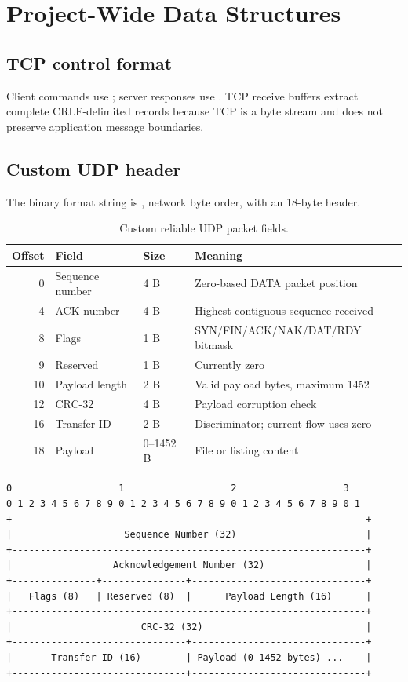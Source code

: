 \section{Project-Wide Data Structures}
\subsection{TCP control format}

Client commands use ;
server responses use .
TCP receive buffers extract complete CRLF-delimited records because TCP is a
byte stream and does not preserve application message boundaries.

\subsection{Custom UDP header}

The binary format string is , network byte order, with an
18-byte header.

\begin{table}[H]
\centering
\begin{tabular}{rllp{}}
\toprule
Offset & Field & Size & Meaning\\
\midrule
0 & Sequence number & 4 B & Zero-based DATA packet position\\
4 & ACK number & 4 B & Highest contiguous sequence received\\
8 & Flags & 1 B & SYN/FIN/ACK/NAK/DAT/RDY bitmask\\
9 & Reserved & 1 B & Currently zero\\
10 & Payload length & 2 B & Valid payload bytes, maximum 1452\\
12 & CRC-32 & 4 B & Payload corruption check\\
16 & Transfer ID & 2 B & Discriminator; current flow uses zero\\
18 & Payload & 0--1452 B & File or listing content\\
\bottomrule
\end{tabular}
\caption{Custom reliable UDP packet fields.}
\end{table}

\begin{lstlisting}
0                   1                   2                   3
0 1 2 3 4 5 6 7 8 9 0 1 2 3 4 5 6 7 8 9 0 1 2 3 4 5 6 7 8 9 0 1
+---------------------------------------------------------------+
|                    Sequence Number (32)                       |
+---------------------------------------------------------------+
|                  Acknowledgement Number (32)                  |
+---------------+---------------+-------------------------------+
|   Flags (8)   | Reserved (8)  |      Payload Length (16)      |
+---------------------------------------------------------------+
|                       CRC-32 (32)                             |
+-------------------------------+-------------------------------+
|       Transfer ID (16)        | Payload (0-1452 bytes) ...    |
+-------------------------------+-------------------------------+
\end{lstlisting}

